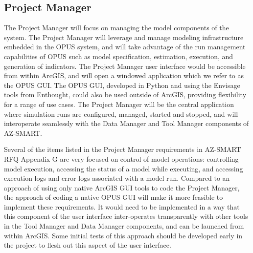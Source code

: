


\subsection{Project Manager}

The Project Manager will focus on managing the model components of the
system. The Project Manager will leverage and manage modeling infrastructure
embedded in the OPUS system, and will take advantage of the run management
capabilities of OPUS such as model specification, estimation, execution, and
generation of indicators.  The Project Manager user interface would be
accessible from within ArcGIS, and will open a windowed application which
we refer to as the OPUS GUI.  The OPUS GUI, developed in Python and using
the Envisage tools from Enthought, could also be used outside of ArcGIS,
providing flexibility for a range of use cases.  The Project Manager will
be the central application where simulation runs are configured, managed,
started and stopped, and will interoperate seamlessly with the Data Manager
and Tool Manager components of AZ-SMART.

Several of the items listed in the Project Manager requirements in
AZ-SMART RFQ Appendix G are very focused on control of model
operations: controlling model execution, accessing the status of a
model while executing, and accessing execution logs and error logs
associated with a model run. Compared to an approach of using only
native ArcGIS GUI tools to code the Project Manager, the approach of
coding a native OPUS GUI will make it more feasible to implement
these requirements.  It would need to be implemented in a way that
this component of the user interface inter-operates transparently
with other tools in the Tool Manager and Data Manager components,
and can be launched from within ArcGIS. Some initial tests of this
approach should be developed early in the project to flesh out this
aspect of the user interface.
